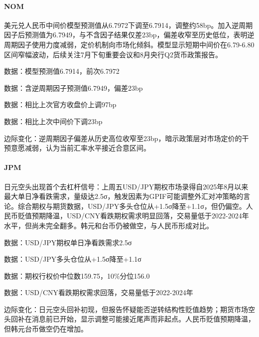 \documentclass[11pt]{ctexart}
\begin{document}
\paragraph{NOM} 美元兑人民币中间价模型预测值从6.7972下调至6.7914，调整约58bp。加入逆周期因子后预测值为6.7949，与不含因子结果仅差23bp，偏差收窄至历史低位，表明逆周期因子使用力度减弱，定价机制向市场化倾斜。模型显示短期中间价在6.79-6.80区间窄幅波动，后续关注7月下旬重要会议和8月央行Q2货币政策报告。
{\small\color{refgray}数据：模型预测值6.7914，前次6.7972\par}
{\small\color{refgray}数据：含逆周期因子预测值6.7949，偏差23bp\par}
{\small\color{refgray}数据：相比上次官方收盘价上调97bp\par}
{\small\color{refgray}数据：相比上次中间价下调23bp\par}
{\small\color{refgray}边际变化：逆周期因子偏差从历史高位收窄至23bp，暗示政策层对市场定价的干预意愿减弱，认为当前汇率水平接近合意区间。\par}
\paragraph{JPM} 日元空头出现首个去杠杆信号：上周五USD/JPY期权市场录得自2025年8月以来最大单日净看跌需求，量级达2.5σ，触发因素为GPIF可能调整外汇对冲策略的言论。综合期权与期货数据，USD/JPY多头仓位从+1.5σ降至+1.1σ，但仍偏空。人民币贬值预期降温，USD/CNY看跌期权需求明显回落，交易量低于2022-2024年水平，但尚未完全翻多。韩元和台币仍被做空，与人民币形成对比。
{\small\color{refgray}数据：USD/JPY期权单日净看跌需求2.5σ\par}
{\small\color{refgray}数据：USD/JPY多头仓位从+1.5σ降至+1.1σ\par}
{\small\color{refgray}数据：期权行权价中位数159.75，10\%分位156.0\par}
{\small\color{refgray}数据：USD/CNY看跌期权需求回落，交易量低于2022-2024年\par}
{\small\color{refgray}边际变化：日元空头回补初现，但报告怀疑能否逆转结构性贬值趋势；期货市场空头回补在消息前已开始，显示调整可能接近尾声而非起点。人民币贬值预期降温，但韩元台币做空仍在增加。\par}
\end{document}
